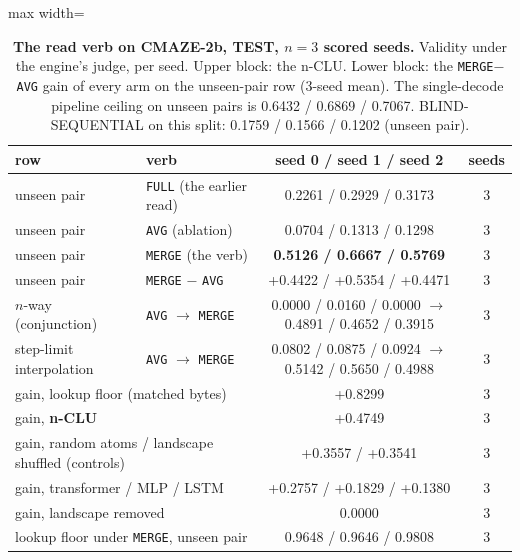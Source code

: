 \documentclass{article} %
\begin{document}
\begin{table}[t]
\centering\small
\caption{\textbf{The read verb on CMAZE-2b, TEST, $n=3$ scored seeds.} Validity under the engine's
judge, per seed. Upper block: the n-CLU. Lower block: the \texttt{MERGE}$-$\texttt{AVG} gain of
every arm on the unseen-pair row (3-seed mean). The single-decode pipeline ceiling on unseen
pairs is 0.6432 / 0.6869 / 0.7067. BLIND-SEQUENTIAL on this split: 0.1759 / 0.1566 / 0.1202 %
(unseen pair).}
\label{tab:verb}
\setlength{\tabcolsep}{3pt}
\begin{adjustbox}{max width=\linewidth}\begin{tabular}{llcc}
\toprule
row & verb & seed 0 / seed 1 / seed 2 & seeds \\
\midrule
unseen pair & \texttt{FULL} (the earlier read) & 0.2261 / 0.2929 / 0.3173 & 3 \\
unseen pair & \texttt{AVG} (ablation) & 0.0704 / 0.1313 / 0.1298 & 3 \\
unseen pair & \texttt{MERGE} (the verb) & \textbf{0.5126 / 0.6667 / 0.5769} & 3 \\
unseen pair & \texttt{MERGE} $-$ \texttt{AVG} & +0.4422 / +0.5354 / +0.4471 & 3 \\
$n$-way (conjunction) & \texttt{AVG} $\to$ \texttt{MERGE} & 0.0000 / 0.0160 / 0.0000 $\to$ 0.4891 / 0.4652 / 0.3915 & 3 \\
step-limit interpolation & \texttt{AVG} $\to$ \texttt{MERGE} & 0.0802 / 0.0875 / 0.0924 $\to$ 0.5142 / 0.5650 / 0.4988 & 3 \\
\midrule
\multicolumn{2}{l}{gain, lookup floor (matched bytes)} & +0.8299 & 3 \\
\multicolumn{2}{l}{gain, \textbf{n-CLU}} & +0.4749 & 3 \\
\multicolumn{2}{l}{gain, random atoms / landscape shuffled (controls)} & +0.3557 / +0.3541 & 3 \\
\multicolumn{2}{l}{gain, transformer / MLP / LSTM} & +0.2757 / +0.1829 / +0.1380 & 3 \\
\multicolumn{2}{l}{gain, landscape removed} & 0.0000 & 3 \\
\multicolumn{2}{l}{lookup floor under \texttt{MERGE}, unseen pair} & 0.9648 / 0.9646 / 0.9808 & 3 \\
\bottomrule
\end{tabular}\end{adjustbox}
\end{table}
\end{document}

